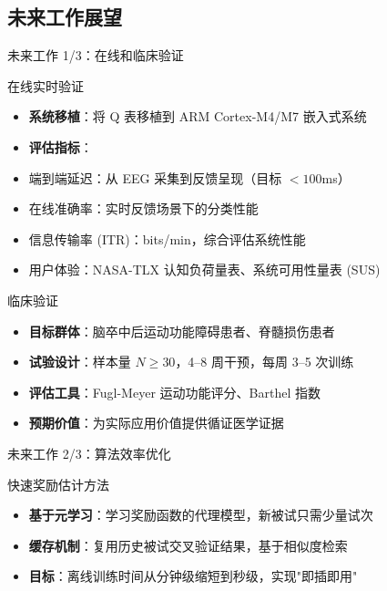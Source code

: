 {%
\subsection{未来工作展望}

\begin{frame}{未来工作 1/3：在线和临床验证}
    \begin{block}{在线实时验证}
        \begin{itemize}
            \item \textbf{系统移植}：将 Q 表移植到 ARM Cortex-M4/M7 嵌入式系统
            \item \textbf{评估指标}：
                \item 端到端延迟：从 EEG 采集到反馈呈现（目标 $< 100$ms）
                \item 在线准确率：实时反馈场景下的分类性能
                \item 信息传输率 (ITR)：bits/min，综合评估系统性能
                \item 用户体验：NASA-TLX 认知负荷量表、系统可用性量表 (SUS)
        \end{itemize}
    \end{block}

    \begin{block}{临床验证}
        \begin{itemize}
            \item \textbf{目标群体}：脑卒中后运动功能障碍患者、脊髓损伤患者
            \item \textbf{试验设计}：样本量 $N \geq 30$，4--8 周干预，每周 3--5 次训练
            \item \textbf{评估工具}：Fugl-Meyer 运动功能评分、Barthel 指数
            \item \textbf{预期价值}：为实际应用价值提供循证医学证据
        \end{itemize}
    \end{block}
\end{frame}

\begin{frame}{未来工作 2/3：算法效率优化}
    \begin{block}{快速奖励估计方法}
        \begin{itemize}
            \item \textbf{基于元学习}：学习奖励函数的代理模型，新被试只需少量试次
            \item \textbf{缓存机制}：复用历史被试交叉验证结果，基于相似度检索
            \item \textbf{目标}：离线训练时间从分钟级缩短到秒级，实现"即插即用"
        \end{itemize}
    \end{block}


\end{frame}}
